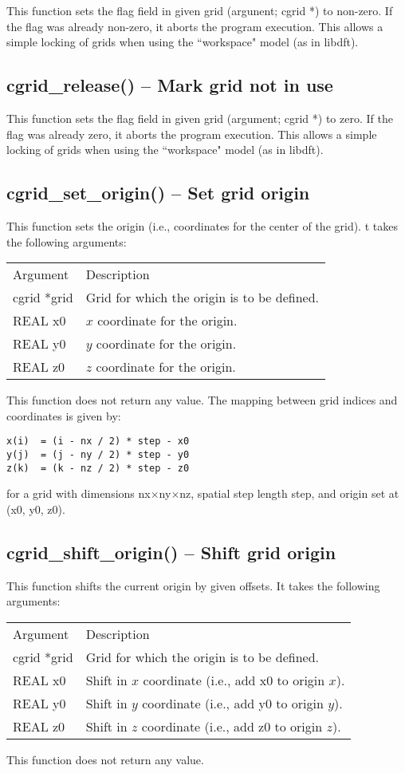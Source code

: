 \documentclass[12pt,letterpaper]{report}
\begin{document}
This function sets the flag field in given grid (argunent; cgrid *) to non-zero. If the flag was already non-zero, it aborts the program execution. This allows a simple locking of grids when using the ``workspace" model (as in libdft).

\subsection{cgrid\_release() -- Mark grid not in use}

This function sets the flag field in given grid (argument; cgrid *) to zero. If the flag was already zero, it aborts the program execution. This allows a simple locking of grids when using the ``workspace" model (as in libdft).

\subsection{cgrid\_set\_origin() -- Set grid origin}

This function sets the origin (i.e., coordinates for the center of the grid). t takes the following arguments:
\begin{longtable}{p{} p{}}
Argument & Description\\
\cline{1-2}
cgrid *grid & Grid for which the origin is to be defined.\\
REAL x0 & $x$ coordinate for the origin.\\
REAL y0 & $y$ coordinate for the origin.\\
REAL z0 & $z$ coordinate for the origin.\\
\end{longtable}
\noindent
This function does not return any value. The mapping between grid indices and coordinates is given by:
\begin{verbatim}
x(i)  = (i - nx / 2) * step - x0
y(j)  = (j - ny / 2) * step - y0
z(k)  = (k - nz / 2) * step - z0
\end{verbatim}
for a grid with dimensions nx$\times$ny$\times$nz, spatial step length step, and origin set at (x0, y0, z0).

\subsection{cgrid\_shift\_origin() -- Shift grid origin}

This function shifts the current origin by given offsets. It takes the following arguments:
\begin{longtable}{p{} p{}}
Argument & Description\\
\cline{1-2}
cgrid *grid & Grid for which the origin is to be defined.\\
REAL x0 & Shift in $x$ coordinate (i.e., add x0 to origin $x$).\\
REAL y0 & Shift in $y$ coordinate (i.e., add y0 to origin $y$).\\
REAL z0 & Shift in $z$ coordinate (i.e., add z0 to origin $z$).\\
\end{longtable}
\noindent
This function does not return any value.
\end{document}
